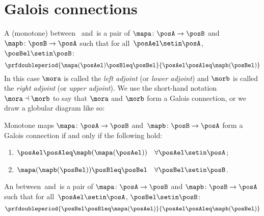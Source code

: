\section{Galois connections}\label{sec:galois-connections}


\begin{ctdefinition}\label{def:monotone-galois-connection}
    A (monotone)  between ~\posA and~\posB is a pair of 
    $\mapa\colon \posA\to \posB$ and~$\mapb\colon \posB\to \posA$ such that for all~$\posAel\setin \posA$,~$\posBel\setin \posB$:
    \begin{equation}
        \prfdoubleperiod{\mapa(\posAel) \posBleq \posBel}{\posAel \posAleq \mapb(\posBel)}
    \end{equation}
    In this case $\mora$ is called the \emph{left adjoint} (or \emph{lower adjoint}) and $\morb$ is called the \emph{right adjoint} (or \emph{upper adjoint}).
    We use the short-hand notation $\mora \dashv \morb$ to say that $\mora$ and $\morb$ form a Galois connection, or we draw a globular diagram like so:
\end{ctdefinition}

\begin{lemma}\label{lem:alternative-def-Galois-connection}
    Monotone maps $\mapa\colon \posA\to \posB$ and~$\mapb\colon \posB\to \posA$ form a Galois connection if and only if the following hold:
    \begin{enumerate}
        \item $\posAel\posAleq \mapb(\mapa(\posAel)) \quad \forall \posAel\setin \posA$;
        \item $\mapa(\mapb(\posBel)) \posBleq \posBel \quad \forall \posBel\setin \posB$.
    \end{enumerate}
\end{lemma}

\begin{ctdefinition}\label{def:antitone-galois-connection}
    An  between~\posA and~\posB is a pair of  $\mapa\colon \posA\to \posB$ and $\mapb \colon \posB\to \posA$ such that for all~$\posAel\setin \posA$, $\posBel\setin \posB$:
    \begin{equation}
        \prfdoubleperiod{\posBel \posBleq \mapa(\posAel)}{\posAel \posAleq \mapb(\posBel)}
    \end{equation}
\end{ctdefinition}


